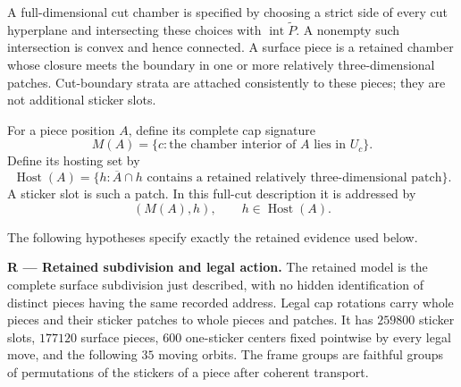 \documentclass[
  10pt,
  a4paper,
]{article}
\newcounter{none} %
\begin{document}
A full-dimensional cut chamber is specified by choosing a strict side of
every cut hyperplane and intersecting these choices with
\(\operatorname{int}\widetilde P\). A nonempty such intersection is
convex and hence connected. A surface piece is a retained chamber whose
closure meets the boundary in one or more relatively three-dimensional
patches. Cut-boundary strata are attached consistently to these pieces;
they are not additional sticker slots.

For a piece position \(A\), define its complete cap signature
\begin{equation}
M(A)=\{c:\text{the chamber interior of }A\text{ lies in }U_c\}.
\end{equation} Define its hosting set by \begin{equation}
\operatorname{Host}(A)
=
\{h:\overline A\cap h\text{ contains a retained relatively three-dimensional patch}\}.
\end{equation} A sticker slot is such a patch. In this full-cut
description it is addressed by \begin{equation}
(M(A),h),\qquad h\in\operatorname{Host}(A).
\end{equation}

The following hypotheses specify exactly the retained evidence used
below.

\textbf{R --- Retained subdivision and legal action.} The retained model
is the complete surface subdivision just described, with no hidden
identification of distinct pieces having the same recorded address.
Legal cap rotations carry whole pieces and their sticker patches to
whole pieces and patches. It has \(259800\) sticker slots, \(177120\)
surface pieces, \(600\) one-sticker centers fixed pointwise by every
legal move, and the following \(35\) moving orbits. The frame groups are
faithful groups of permutations of the stickers of a piece after
coherent transport.
\end{document}
